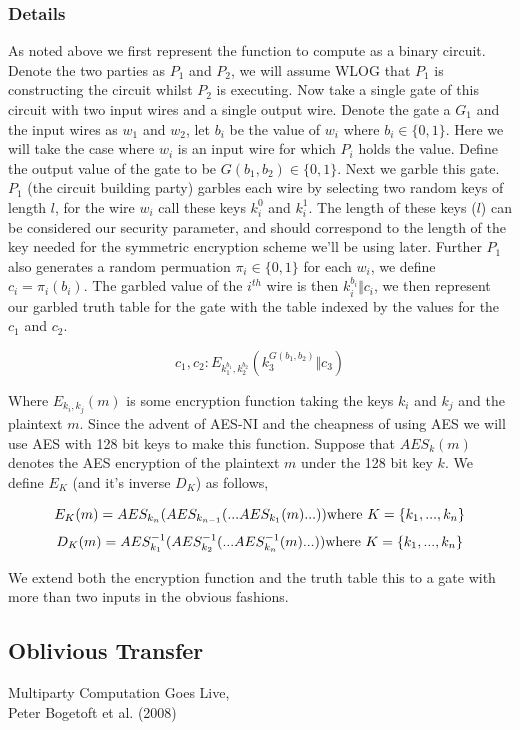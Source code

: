 \documentclass[a4paper,10pt]{article}
\begin{document}
	\subsubsection{Details} \label{Yao_Details}
		As noted above we first represent the function to compute as a binary circuit. Denote the two parties as $P_1$ and $P_2$, we will assume WLOG that $P_1$ is constructing the circuit whilst $P_2$ is executing. Now take a single gate of this circuit with two input wires and a single output wire. Denote the gate a $G_1$ and the input wires as $w_1$ and $w_2$, let $b_i$ be the value of $w_i$ where $b_i \in \{0, 1\}$. Here we will take the case where $w_i$ is an input wire for which $P_i$ holds the value. Define the output value of the gate to be $G(b_1, b_2) \in \{0, 1\}$. Next we garble this gate.\\

		$P_1$ (the circuit building party) garbles each wire by selecting two random keys of length $l$, for the wire $w_i$ call these keys $k_i^0$ and $k_i^1$. The length of these keys ($l$) can be considered our security parameter, and should correspond to the length of the key needed for the symmetric encryption scheme we'll be using later. Further $P_1$ also generates a random permuation $\pi_i \in \{0, 1\}$ for each $w_i$, we define $c_i = \pi_i(b_i)$. The garbled value of the $i^{th}$ wire is then $k_i^{b_i} \Vert c_i$, we then represent our garbled truth table for the gate with the table indexed by the values for the $c_1$ and $c_2$.

		$$ c_1, c_2 : E_{k_1^{b_1}, k_2^{b_2}} (k_3^{ G(b_1, b_2) } \Vert c_3) $$

		Where $E_{k_i, k_j}(m)$ is some encryption function taking the keys $k_i$ and $k_j$ and the plaintext $m$. Since the advent of AES-NI and the cheapness of using AES we will use AES with 128 bit keys to make this function. Suppose that $AES_k(m)$ denotes the AES encryption of the plaintext $m$ under the 128 bit key $k$. We define $E_K$ (and it's inverse $D_K$)  as follows,

		$$ E_K(m) = AES_{k_n}( AES_{k_{n-1}}( ...AES_{k_1}(m) ...) ) \textnormal{where } K = \{k_1, ..., k_n\}$$ 
		$$ D_K(m) = AES^{-1}_{k_1}( AES^{-1}_{k_{2}}( ...AES^{-1}_{k_n}(m) ...) ) \textnormal{where } K = \{k_1, ..., k_n\}$$ 

		We extend both the encryption function and the truth table this to a gate with more than two inputs in the obvious fashions.

    \subsection{Oblivious Transfer} \label{OT_Intro}




\begin{thebibliography}{5}


Multiparty Computation Goes Live,\\
Peter Bogetoft et al. (2008)


\end{thebibliography}
\end{document}
